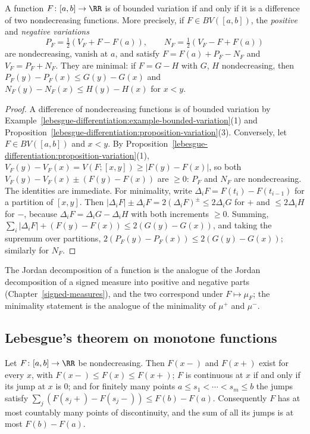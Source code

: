\begin{theorem}\label{lebesgue-differentiation:theorem-jordan}
A function $F \colon [a, b] \to \RR$ is of bounded variation if and only if it is a difference of two nondecreasing functions. More precisely, if $F \in BV([a, b])$, the \emph{positive} and
\emph{negative variations}
\[
P_F = \tfrac12(V_F + F - F(a)), \qquad N_F = \tfrac12(V_F - F + F(a))
\]
are nondecreasing, vanish at $a$, and satisfy $F = F(a) + P_F - N_F$ and $V_F = P_F + N_F$. They are minimal: if $F = G - H$ with $G$, $H$ nondecreasing, then
$P_F(y) - P_F(x) \leq G(y) - G(x)$ and $N_F(y) - N_F(x) \leq H(y) - H(x)$ for $x < y$.
\end{theorem}

\begin{proof}
A difference of nondecreasing functions is of bounded variation by Example~\ref{lebesgue-differentiation:example-bounded-variation}(1) and Proposition~\ref{lebesgue-differentiation:proposition-variation}(3).
Conversely, let $F \in BV([a, b])$ and $x < y$. By Proposition~\ref{lebesgue-differentiation:proposition-variation}(1), $V_F(y) - V_F(x) = V(F; [x, y]) \geq |F(y) - F(x)|$, so both
$V_F(y) - V_F(x) \pm (F(y) - F(x))$ are $\geq 0$: $P_F$ and $N_F$ are nondecreasing. The identities are immediate. For minimality, write $\Delta_iF = F(t_i) - F(t_{i-1})$ for a partition of $[x, y]$. Then
$|\Delta_iF| \pm \Delta_iF = 2(\Delta_iF)^{\pm} \leq 2\Delta_iG$ for $+$ and $\leq 2\Delta_iH$ for $-$, because $\Delta_iF = \Delta_iG - \Delta_iH$ with both increments $\geq 0$. Summing,
$\sum_i|\Delta_iF| + (F(y) - F(x)) \leq 2(G(y) - G(x))$, and taking the supremum over partitions, $2(P_F(y) - P_F(x)) \leq 2(G(y) - G(x))$; similarly for $N_F$.
\end{proof}

The Jordan decomposition of a function is the analogue of the Jordan decomposition of a signed measure into positive and negative parts (Chapter~\ref{signed-measures}), and the two correspond under
$F \mapsto \mu_F$; the minimality statement is the analogue of the minimality of $\mu^+$ and $\mu^-$.

\subsection{Lebesgue's theorem on monotone functions}\label{lebesgue-differentiation:subsection-monotone}

\begin{lemma}\label{lebesgue-differentiation:lemma-monotone-jumps}
Let $F \colon [a, b] \to \RR$ be nondecreasing. Then $F(x-)$ and $F(x+)$ exist for every $x$, with $F(x-) \leq F(x) \leq F(x+)$; $F$ is continuous at $x$ if and only if its jump at $x$ is $0$; and for
finitely many points $a \leq s_1 < \cdots < s_m \leq b$ the jumps satisfy $\sum_j(F(s_j+) - F(s_j-)) \leq F(b) - F(a)$. Consequently $F$ has at most countably many points of discontinuity, and the sum of all
its jumps is at most $F(b) - F(a)$.
\end{lemma}


